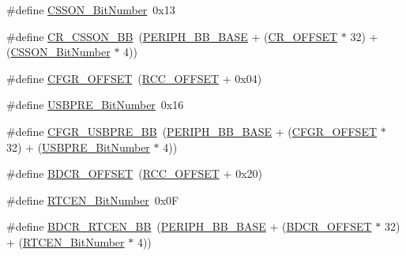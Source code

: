 \begin{DoxyCompactItemize}
\item 
\#define \hyperlink{group___r_c_c___private___defines_ga253fa44d87aabc55f0cd6628e77a51fd}{C\+S\+S\+O\+N\+\_\+\+Bit\+Number}~0x13
\item 
\#define \hyperlink{group___r_c_c___private___defines_gaca914aed10477ae4090fea0a9639b1ea}{C\+R\+\_\+\+C\+S\+S\+O\+N\+\_\+\+BB}~(\hyperlink{openmotestm_2library_2inc_2stm32f10x__map_8h_aed7efc100877000845c236ccdc9e144a}{P\+E\+R\+I\+P\+H\+\_\+\+B\+B\+\_\+\+B\+A\+SE} + (\hyperlink{openmotestm_2library_2src_2stm32f10x__rcc_8c_afa1d3d0ea72132df651c76fc1bdffffc}{C\+R\+\_\+\+O\+F\+F\+S\+ET} $\ast$ 32) + (\hyperlink{openmotestm_2library_2src_2stm32f10x__rcc_8c_a253fa44d87aabc55f0cd6628e77a51fd}{C\+S\+S\+O\+N\+\_\+\+Bit\+Number} $\ast$ 4))
\item 
\#define \hyperlink{group___r_c_c___private___defines_ga8682298330c3b9bae1992e4f1a0af985}{C\+F\+G\+R\+\_\+\+O\+F\+F\+S\+ET}~(\hyperlink{openmotestm_2library_2src_2stm32f10x__rcc_8c_a539e07c3b3c55f1f1d47231341fb11e1}{R\+C\+C\+\_\+\+O\+F\+F\+S\+ET} + 0x04)
\item 
\#define \hyperlink{group___r_c_c___private___defines_gad758d602b6d2b93a04cb8ada87c20c82}{U\+S\+B\+P\+R\+E\+\_\+\+Bit\+Number}~0x16
\item 
\#define \hyperlink{group___r_c_c___private___defines_gabde4e60349b8412a79611c0aeb27c3a2}{C\+F\+G\+R\+\_\+\+U\+S\+B\+P\+R\+E\+\_\+\+BB}~(\hyperlink{openmotestm_2library_2inc_2stm32f10x__map_8h_aed7efc100877000845c236ccdc9e144a}{P\+E\+R\+I\+P\+H\+\_\+\+B\+B\+\_\+\+B\+A\+SE} + (\hyperlink{openmotestm_2library_2src_2stm32f10x__rcc_8c_a8682298330c3b9bae1992e4f1a0af985}{C\+F\+G\+R\+\_\+\+O\+F\+F\+S\+ET} $\ast$ 32) + (\hyperlink{openmotestm_2library_2src_2stm32f10x__rcc_8c_ad758d602b6d2b93a04cb8ada87c20c82}{U\+S\+B\+P\+R\+E\+\_\+\+Bit\+Number} $\ast$ 4))
\item 
\#define \hyperlink{group___r_c_c___private___defines_ga5f8a0c3cb5f5c835bf7eef09515138ad}{B\+D\+C\+R\+\_\+\+O\+F\+F\+S\+ET}~(\hyperlink{openmotestm_2library_2src_2stm32f10x__rcc_8c_a539e07c3b3c55f1f1d47231341fb11e1}{R\+C\+C\+\_\+\+O\+F\+F\+S\+ET} + 0x20)
\item 
\#define \hyperlink{group___r_c_c___private___defines_ga9302c551752124766afc4cee65436405}{R\+T\+C\+E\+N\+\_\+\+Bit\+Number}~0x0F
\item 
\#define \hyperlink{group___r_c_c___private___defines_gaf70aaf70b0752ccb3a60307b2fb46038}{B\+D\+C\+R\+\_\+\+R\+T\+C\+E\+N\+\_\+\+BB}~(\hyperlink{openmotestm_2library_2inc_2stm32f10x__map_8h_aed7efc100877000845c236ccdc9e144a}{P\+E\+R\+I\+P\+H\+\_\+\+B\+B\+\_\+\+B\+A\+SE} + (\hyperlink{openmotestm_2library_2src_2stm32f10x__rcc_8c_a5f8a0c3cb5f5c835bf7eef09515138ad}{B\+D\+C\+R\+\_\+\+O\+F\+F\+S\+ET} $\ast$ 32) + (\hyperlink{openmotestm_2library_2src_2stm32f10x__rcc_8c_a9302c551752124766afc4cee65436405}{R\+T\+C\+E\+N\+\_\+\+Bit\+Number} $\ast$ 4))

\end{DoxyCompactItemize}

